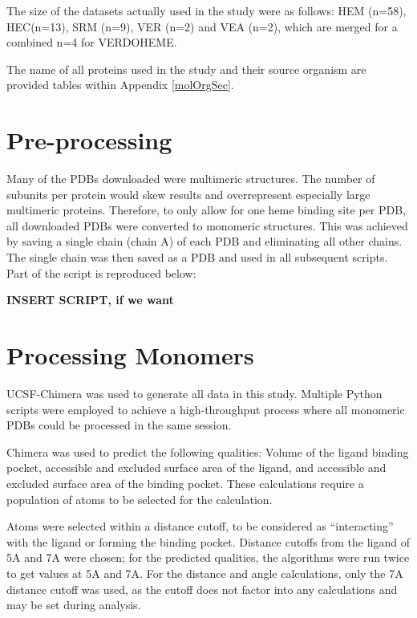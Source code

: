 \documentclass[a4paper, nobind]{templates/ociamthesis}
\begin{document}
The size of the datasets actually used in the study were as follows: HEM (n=58), HEC(n=13), SRM (n=9), VER (n=2) and VEA (n=2), which are merged for a combined n=4 for VERDOHEME.

The name of all proteins used in the study and their source organism are provided tables within Appendix \ref{molOrgSec}.

\hypertarget{pre-processing}{%
\section{Pre-processing}\label{pre-processing}}

Many of the PDBs downloaded were multimeric structures. The number of subunits per protein would skew results and overrepresent especially large multimeric proteins. Therefore, to only allow for one heme binding site per PDB, all downloaded PDBs were converted to monomeric structures. This was achieved by saving a single chain (chain A) of each PDB and eliminating all other chains. The single chain was then saved as a PDB and used in all subsequent scripts. Part of the script is reproduced below:

\textbf{INSERT SCRIPT, if we want}

\hypertarget{processing-monomers}{%
\section{Processing Monomers}\label{processing-monomers}}

UCSF-Chimera was used to generate all data in this study. Multiple Python scripts were employed to achieve a high-throughput process where all monomeric PDBs could be processed in the same session.

Chimera was used to predict the following qualities: Volume of the ligand binding pocket, accessible and excluded surface area of the ligand, and accessible and excluded surface area of the binding pocket. These calculations require a population of atoms to be selected for the calculation.

Atoms were selected within a distance cutoff, to be considered as ``interacting'' with the ligand or forming the binding pocket. Distance cutoffs from the ligand of 5A and 7A were chosen; for the predicted qualities, the algorithms were run twice to get values at 5A and 7A. For the distance and angle calculations, only the 7A distance cutoff was used, as the cutoff does not factor into any calculations and may be set during analysis.
\end{document}
